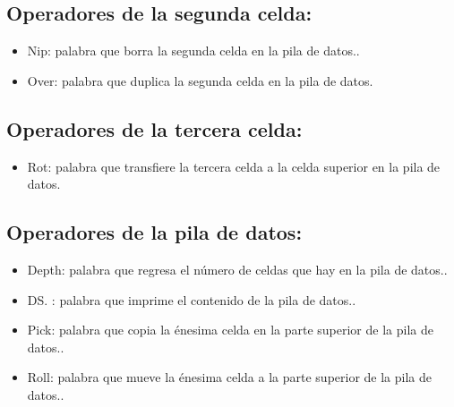 \documentclass[conference]{IEEEtran}
\begin{document}
\subsection{Operadores de la segunda celda:}
\begin{itemize}
\item Nip: palabra que borra la segunda celda en la pila de datos..
\item Over: palabra que duplica la segunda celda en la pila de datos.
\end{itemize}
\subsection{Operadores de la tercera celda:}
\begin{itemize}
\item Rot: palabra que transfiere la tercera celda a la celda superior en la pila de datos.
\end{itemize}
\subsection{Operadores de la pila de datos:}
\begin{itemize}
\item Depth: palabra que regresa el número de celdas que hay en la pila de datos..
\item DS. : palabra que imprime el contenido de la pila de datos..
\item Pick: palabra que copia la énesima celda en la parte superior de la pila de datos..
\item Roll: palabra que mueve la énesima celda a la parte superior de la pila de datos..
\end{itemize}
\end{document}
